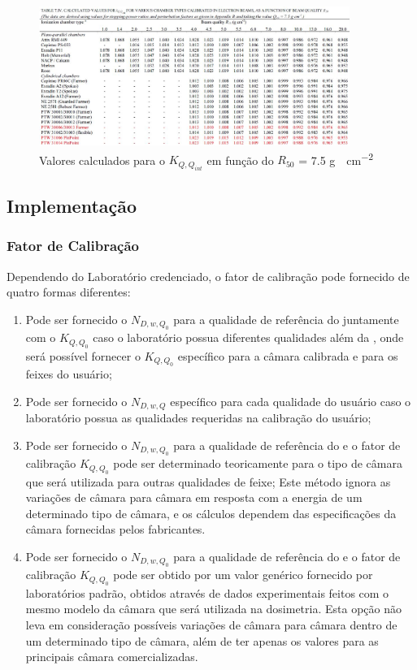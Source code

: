 \documentclass[11pt,a4paper]{article}
\begin{document}
		\begin{figure}[h]
			\centering
			\includegraphics[width=0.9\textwidth]{Imagens/tabela74trs398.JPG}
			\caption{Valores calculados para o $K_{Q,Q_{int}}$ em função do $R_{50}$ = 7.5 \unit{g \cdot cm^{-2}} }
			\label{fig:tabela74trs398}
		\end{figure}
 
	\subsection*{Implementação}

	\subsubsection*{Fator de Calibração}

		Dependendo do Laboratório credenciado, o fator de calibração pode fornecido de quatro formas diferentes:

		\begin{enumerate}
			\item Pode ser fornecido o $N_{D,w,Q_0}$ para a qualidade de referência do  juntamente com o  $K_{Q,Q_0}$ caso o laboratório possua diferentes qualidades além da , onde será possível fornecer o $K_{Q,Q_0}$ específico para a câmara calibrada e para os feixes do usuário;
			
			\item Pode ser fornecido o $N_{D,w,Q}$ específico para cada qualidade do usuário caso o laboratório possua as qualidades requeridas na calibração do usuário;
			
			\item Pode ser fornecido o $N_{D,w,Q_0}$ para a qualidade de referência do  e o fator de calibração $K_{Q,Q_0}$ pode ser determinado teoricamente para o tipo de câmara que será utilizada para outras qualidades de feixe; Este método ignora as variações de câmara para câmara em resposta com a energia de um determinado tipo de câmara, e os cálculos dependem das especificações da câmara fornecidas pelos fabricantes.
	
			\item Pode ser fornecido o $N_{D,w,Q_0}$ para a qualidade de referência do  e o fator de calibração $K_{Q,Q_0}$ pode ser obtido por um valor genérico fornecido por laboratórios padrão, obtidos através de dados experimentais feitos com o mesmo modelo da câmara que será utilizada na dosimetria. Esta opção não leva em consideração possíveis variações de câmara para câmara dentro de um determinado tipo de câmara, além de ter apenas os valores para as principais câmara comercializadas. 
		\end{enumerate}
\end{document}
